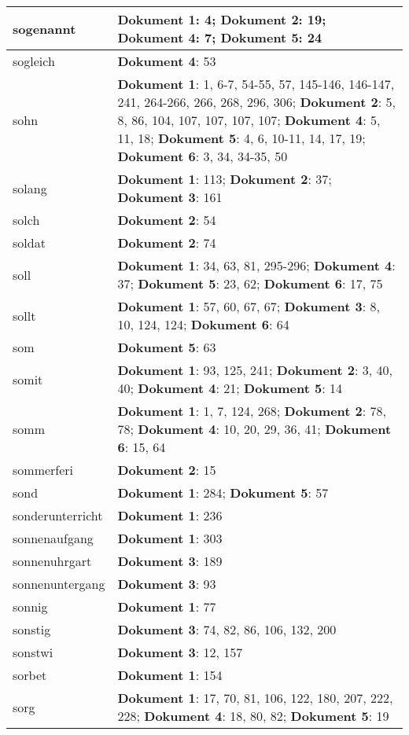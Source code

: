 \documentclass[a5paper]{article}
\begin{document}
\begin{longtable}[l]{|l|p{3in}|}
\hline
sogenannt & \textbf{Dokument 1}: 4; \textbf{Dokument 2}: 19; \textbf{Dokument 4}: 7; \textbf{Dokument 5}: 24 \\
\hline
sogleich & \textbf{Dokument 4}: 53 \\
\hline
sohn & \textbf{Dokument 1}: 1, 6-7, 54-55, 57, 145-146, 146-147, 241, 264-266, 266, 268, 296, 306; \textbf{Dokument 2}: 5, 8, 86, 104, 107, 107, 107, 107; \textbf{Dokument 4}: 5, 11, 18; \textbf{Dokument 5}: 4, 6, 10-11, 14, 17, 19; \textbf{Dokument 6}: 3, 34, 34-35, 50 \\
\hline
solang & \textbf{Dokument 1}: 113; \textbf{Dokument 2}: 37; \textbf{Dokument 3}: 161 \\
\hline
solch & \textbf{Dokument 2}: 54 \\
\hline
soldat & \textbf{Dokument 2}: 74 \\
\hline
soll & \textbf{Dokument 1}: 34, 63, 81, 295-296; \textbf{Dokument 4}: 37; \textbf{Dokument 5}: 23, 62; \textbf{Dokument 6}: 17, 75 \\
\hline
sollt & \textbf{Dokument 1}: 57, 60, 67, 67; \textbf{Dokument 3}: 8, 10, 124, 124; \textbf{Dokument 6}: 64 \\
\hline
som & \textbf{Dokument 5}: 63 \\
\hline
somit & \textbf{Dokument 1}: 93, 125, 241; \textbf{Dokument 2}: 3, 40, 40; \textbf{Dokument 4}: 21; \textbf{Dokument 5}: 14 \\
\hline
somm & \textbf{Dokument 1}: 1, 7, 124, 268; \textbf{Dokument 2}: 78, 78; \textbf{Dokument 4}: 10, 20, 29, 36, 41; \textbf{Dokument 6}: 15, 64 \\
\hline
sommerferi & \textbf{Dokument 2}: 15 \\
\hline
sond & \textbf{Dokument 1}: 284; \textbf{Dokument 5}: 57 \\
\hline
sonderunterricht & \textbf{Dokument 1}: 236 \\
\hline
sonnenaufgang & \textbf{Dokument 1}: 303 \\
\hline
sonnenuhrgart & \textbf{Dokument 3}: 189 \\
\hline
sonnenuntergang & \textbf{Dokument 3}: 93 \\
\hline
sonnig & \textbf{Dokument 1}: 77 \\
\hline
sonstig & \textbf{Dokument 3}: 74, 82, 86, 106, 132, 200 \\
\hline
sonstwi & \textbf{Dokument 3}: 12, 157 \\
\hline
sorbet & \textbf{Dokument 1}: 154 \\
\hline
sorg & \textbf{Dokument 1}: 17, 70, 81, 106, 122, 180, 207, 222, 228; \textbf{Dokument 4}: 18, 80, 82; \textbf{Dokument 5}: 19 \\

\end{longtable}
\end{document}
